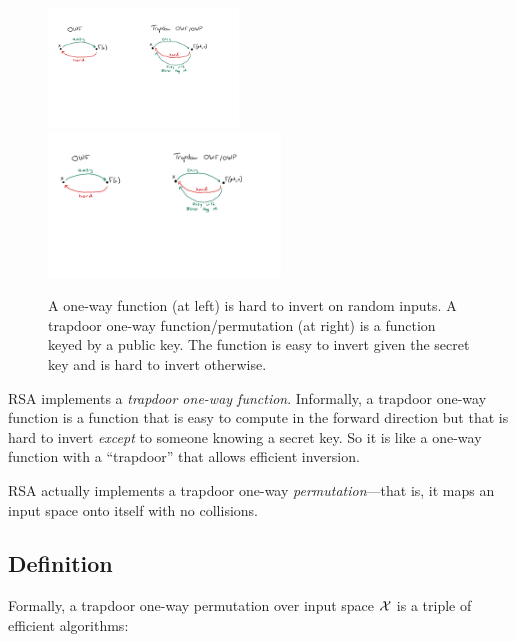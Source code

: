 \begin{figure}
\includegraphics[width=0.45\textwidth]{figs/rsa-owf.pdf}
\includegraphics[width=0.55\textwidth]{figs/rsa-trapdoor.pdf}
\caption{A one-way function (at left) is hard to invert on random inputs.
A trapdoor one-way function/permutation (at right) is a function keyed
by a public key. The function is easy to invert given the secret key 
and is hard to invert otherwise.
}
\end{figure}

RSA implements a \emph{trapdoor one-way function}.
Informally, a trapdoor one-way function is a function that is
easy to compute in the forward direction but that is hard to 
invert \emph{except} to someone knowing a secret key.
So it is like a one-way function with a ``trapdoor'' that allows
efficient inversion.

RSA actually implements a trapdoor one-way \emph{permutation}---that is,
it maps an input space onto itself with no collisions.

\subsection{Definition}

Formally, a trapdoor one-way permutation over input space $\mathcal{X}$ is a triple of
efficient algorithms:

